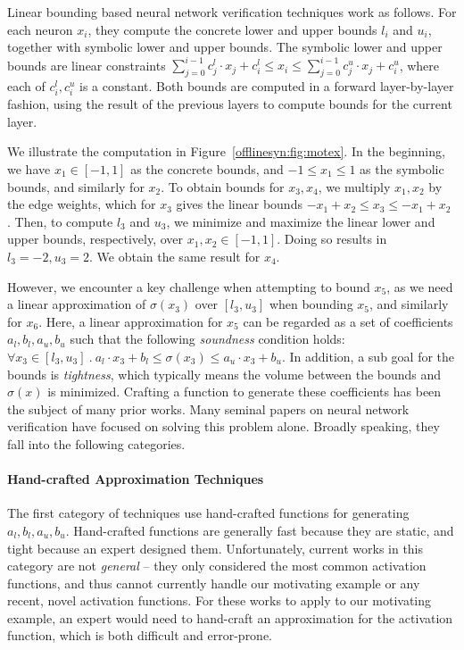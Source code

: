 Linear bounding based neural network verification techniques work as follows.
For each neuron $
x_i $, they compute the concrete lower and upper bounds $ l_i$ and $u_i $,
together with symbolic
lower and upper bounds.  The symbolic lower and upper bounds are linear constraints $
\sum_{j=0}^{i-1} c^l_j \cdot x_j + c^l_i \leq x_i \leq \sum_{j=0}^{i-1} c^u_j
\cdot x_j + c^u_i $, where each of $ c^l_i, c^u_i $ is a constant. Both bounds are
computed in a forward layer-by-layer fashion, using the result of the previous
layers to compute bounds for the current layer.

We illustrate the computation in Figure~\ref{offlinesyn:fig:motex}. In the
beginning, we have $
x_1 \in [-1, 1] $ as the concrete bounds, and $ -1 \leq x_1 \leq 1 $ as the
symbolic  bounds, and similarly for $ x_2 $. To obtain bounds for $ x_3, x_4 $, we
multiply $ x_1, x_2 $ by the edge weights, which for $ x_3 $ gives the linear
bounds $ -x_1 + x_2 \leq x_3 \leq -x_1 + x_2 $ . Then, to compute $ l_3 $ and $
u_3 $, we minimize and maximize the linear lower and upper bounds,
respectively, over $ x_1, x_2 \in [-1, 1] $. Doing so results in $ l_3 = -2,
u_3 = 2 $. We obtain the same result for $ x_4 $.

However, we encounter a key challenge when attempting to bound $ x_5 $, as
we need a linear approximation of $ \sigma(x_3) $ over $ [l_3, u_3] $ when
bounding $ x_5 $, and similarly for $ x_6 $. Here, a linear approximation
for $ x_5 $ can be regarded as a set of coefficients $ a_l, b_l, a_u, b_u $ such that the
following \textit{soundness} condition holds: $ \forall x_3 \in
[l_3, u_3] ~.~ a_l \cdot x_3 + b_l \leq \sigma(x_3) \leq a_u \cdot
x_3 + b_u $.
%
In addition, a sub goal for the bounds is \textit{tightness},
which typically means the volume between the bounds and $ \sigma(x) $ is
minimized.
%
Crafting a function to generate these coefficients has been the
subject of many prior works. Many seminal papers on neural network verification
have focused on solving this problem alone. Broadly speaking, they fall into
the following categories.


\paragraph{Hand-crafted Approximation Techniques} The first category of
techniques use hand-crafted functions for generating $ a_l, b_l, a_u, b_u $.
Hand-crafted functions are generally fast because they are static, and tight
because an expert designed them.
%
Unfortunately, current works in this category are not \textit{general} -- they
only considered the most common activation functions, and thus cannot currently
handle our motivating example or any recent, novel activation functions.
%
For these works to apply to our motivating example, an expert would need to hand-craft an
approximation for the activation function, which is both difficult and error-prone.

